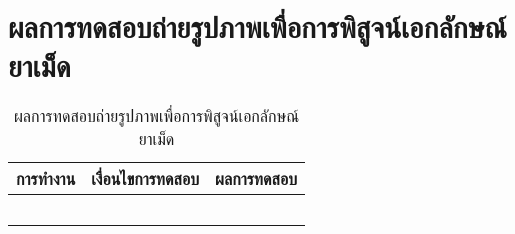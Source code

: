 \section{ผลการทดสอบถ่ายรูปภาพเพื่อการพิสูจน์เอกลักษณ์ยาเม็ด}
	\begin{table}[H]
		\caption{ผลการทดสอบถ่ายรูปภาพเพื่อการพิสูจน์เอกลักษณ์ยาเม็ด}
		\centering	
		\label{tab:test4}
		\begin{tabular}{ | p{4.5cm} | p{4.5cm} | p{4.5cm} | }
		\hline
		การทำงาน & เงื่อนไขการทดสอบ & ผลการทดสอบ \\ \hline
		\setstretch{1.0}{ทดสอบถ่ายรูปภาพเพื่อการพิสูจน์เอกลักษณ์ยาเม็ด}
		& \setstretch{1.0}{กดถ่ายรูปภาพ }
		& \setstretch{1.0}{แอปพลิเคชันจะเปิดกล้องถ่ายรูปของเครื่องผู้ใช้งาน} \\ \cline{2-3} 
		& \setstretch{1.0}{กดประมวลผลภาพ }
		& \setstretch{1.0}{แอปพลิเคชันจะแสดงผลลัพธ์การพิสูจน์เอกลักษณ์ยา และแสดงหน้ารายการค้นหา} \\ \cline{2-3} 
		& \setstretch{1.0}{ถ่ายรูปภาพที่ไม่ใช่ยา และกดประมวลผลภาพ }
		& \setstretch{1.0}{แอปพลิเคชันจะแสดงข้อความ “เกิดข้อผิดพลาด ลองถ่ายรูปใหม่”} \\ \cline{2-3} 
		& \setstretch{1.0}{ถ่ายรูปภาพยาที่ไม่ได้ใช้วัตถุอ้างอิง }
		& \setstretch{1.0}{แอปพลิเคชันจะแสดงผลลัพธ์และไม่สามารถคำนวณขนาดของยาได้} \\ \cline{2-3} 
		& \setstretch{1.0}{ถ่ายรูปภาพยาที่มีลักษณะเหมือนกัน สี ขนาด รูปทรง และเป็นยาต่างชนิดกัน} 
		& \setstretch{1.0}{แอปพลิเคชันจะแสดงผลลัพธ์ที่เหมือนกัน เนื่องจากมีลักษณะทางกายภาพเหมือนกัน} \\ \hline
		\end{tabular}
	\end{table}


